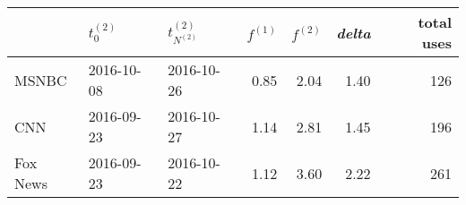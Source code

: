 \begin{tabular}{lllrrrr}
\toprule
  {} & $t_0^{(2)}$ & $t^{(2)}_{N^{(2)}}$ & $f^{(1)}$ & $f^{(2)}$ & \emph{delta} & total uses \\
\midrule
MSNBC    &  2016-10-08 &          2016-10-26 &      0.85 &      2.04 &       1.40 &        126 \\
CNN      &  2016-09-23 &          2016-10-27 &      1.14 &      2.81 &       1.45 &        196 \\
Fox News &  2016-09-23 &          2016-10-22 &      1.12 &      3.60 &       2.22 &        261 \\
\bottomrule
\end{tabular}

